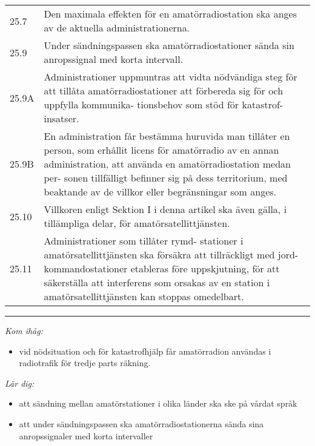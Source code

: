 \begin{tabularx}{\columnwidth}{lX}	
	
	25.7 & Den maximala effekten för en
	amatörradiostation ska anges av de
	aktuella administrationerna.\vspace{1ex}\\
		
	25.9 & Under sändningspassen ska
	amatörradiostationer sända sin
	anropssignal med korta intervall.\vspace{1ex}\\
		
	25.9A & Administrationer uppmuntras att
	vidta nödvändiga steg för att tillåta
	amatörradiostationer att förbereda
	sig för och uppfylla kommunika-
	tionsbehov som stöd för katastrof-
	insatser.\vspace{1ex}\\
	
	25.9B & En administration får bestämma
	huruvida man tillåter en person, som
	erhållit licens för amatörradio av en
	annan administration, att använda
	en amatörradiostation medan per-
	sonen tillfälligt befinner sig på dess
	territorium, med beaktande av de
	villkor eller begränsningar som
	anges.\vspace{1ex}\\
	
	25.10 & Villkoren enligt Sektion I i denna
	artikel ska även gälla, i tillämpliga
	delar, för amatörsatellittjänsten.\vspace{1ex}\\
	
	25.11 & Administrationer som tillåter rymd-
	stationer i amatörsatellittjänsten ska
	försäkra att tillräckligt med jord-
	kommandostationer etableras före
	uppskjutning, för att säkerställa att
	interferens som orsakas av en station
	i amatörsatellittjänsten kan stoppas
	omedelbart.\vspace{1ex}\\
	
\end{tabularx}

\vspace{1em} \hrule \vspace{1em}

\emph{Kom ihåg:}

\begin{itemize}
	\item vid nödsituation och för katastrofhjälp får amatörradion användas i radiotrafik för tredje parts räkning.
\end{itemize}

\emph{Lär dig:}

\begin{itemize}
	\item att sändning mellan amatörstationer i olika länder ska ske på vårdat språk
	\item att under sändningspassen ska amatörradiostationerna sända sina anropssignaler med korta intervaller
\end{itemize}



